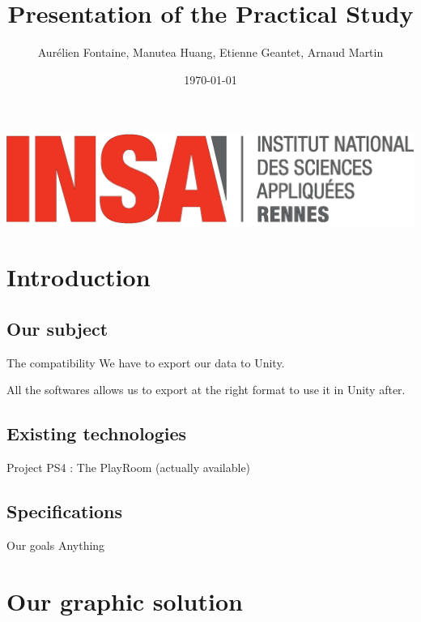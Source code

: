 \documentclass[a4paper,10pt]{beamer}
\title{Presentation of the Practical Study}
\author[Groupe 3INFO]{Aurélien Fontaine, Manutea Huang, Etienne Geantet, Arnaud Martin}
\institute[INSA de Rennes]{Institut National des Sciences Appliquées de Rennes}
\date{\today}
\begin{document}
	\begin{frame}
		\begin{titlepage}
			\centerline{\includegraphics[scale=0.1]{logoINSA.jpg}}
		\end{titlepage}
	\end{frame}
	
	\begin{frame}
		\tableofcontents
	\end{frame}
	
	\section{Introduction}
	
		\subsection{Our subject}
	
			\begin{frame}{}
				\begin{block}{The compatibility}
					We have to export our data to Unity.
				\end{block}
				All the softwares allows us to export at the right format to use it in Unity after.
			\end{frame}
			
		\subsection{Existing technologies}
			
			\begin{frame}{}
				Project PS4 : The PlayRoom (actually available)
			\end{frame}
		
		\subsection{Specifications}
		
			\begin{frame}{Our goals}
				Anything
			\end{frame}
	
	\section{Our graphic solution}
	
\end{document}
